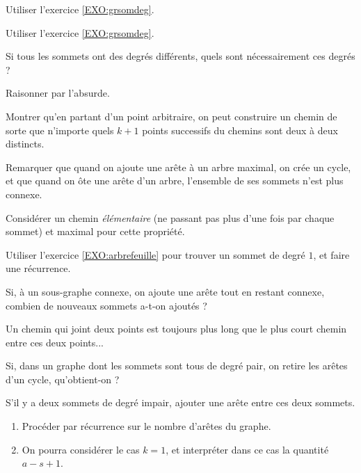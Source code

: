 \begin{Hint}{79}
Utiliser l'exercice \ref{EXO:grsomdeg}.
\end{Hint}
\begin{Hint}{80}
Utiliser l'exercice \ref{EXO:grsomdeg}.
\end{Hint}
\begin{Hint}{81}
Si tous les sommets ont des degrés différents, quels sont nécessairement ces degrés ?
\end{Hint}
\begin{Hint}{82}
Raisonner par l'absurde.
\end{Hint}
\begin{Hint}{83}
Montrer qu'en partant d'un point arbitraire, on peut construire un chemin de sorte que n'importe quels $k+1$ points successifs du chemins sont deux à deux distincts.
\end{Hint}
\begin{Hint}{84}
Remarquer que quand on ajoute une arête à un arbre maximal, on crée un cycle, et que quand on ôte une arête d'un arbre, l'ensemble de ses sommets n'est plus connexe.
\end{Hint}
\begin{Hint}{85}
Considérer un chemin \emph{élémentaire} (ne passant pas plus d'une fois par chaque sommet) et maximal pour cette propriété.
\end{Hint}
\begin{Hint}{86}
Utiliser l'exercice \ref{EXO:arbrefeuille} pour trouver un sommet de degré $1$, et faire une récurrence.
\end{Hint}
\begin{Hint}{87}
Si, à un sous-graphe connexe, on ajoute une arête tout en restant connexe, combien de nouveaux sommets a-t-on ajoutés ?
\end{Hint}
\begin{Hint}{89}
Un chemin qui joint deux points est toujours plus long que le plus court chemin entre ces deux points...
\end{Hint}
\begin{Hint}{90}
Si, dans un graphe dont les sommets sont tous de degré pair, on retire les arêtes d'un cycle, qu'obtient-on  ?
\end{Hint}
\begin{Hint}{91}
S'il y a deux sommets de degré impair, ajouter une arête entre ces deux sommets.
\end{Hint}
\begin{Hint}{92}
\begin{enumerate}
\item Procéder par récurrence sur le nombre d'arêtes du graphe.
\item On pourra considérer le cas $k=1$, et  interpréter dans ce cas la quantité $a-s+1$.%
\end{enumerate}
\end{Hint}
